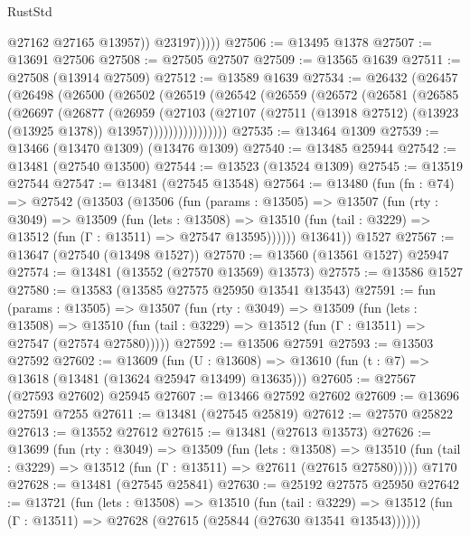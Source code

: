 \begin{lexlean}{RustStd}
\begin{coremodule}
                  @27162
                  @27165
                  @13957))
              @23197)))))
@27506 := @13495 @1378
@27507 := @13691 @27506
@27508 := @27505 @27507
@27509 := @13565 @1639
@27511 := @27508 (@13914 @27509)
@27512 := @13589 @1639
@27534 := @26432
    (@26457
      (@26498
        (@26500
          (@26502
            (@26519
              (@26542
                (@26559
                  (@26572
                    (@26581
                      (@26585
                        (@26697
                          (@26877
                            (@26959
                              (@27103
                                (@27107
                                  (@27511
                                    (@13918 @27512)
                                    (@13923 (@13925 @1378))
                                    @13957))))))))))))))))
@27535 := @13464 @1309
@27539 := @13466 (@13470 @1309) (@13476 @1309)
@27540 := @13485 @25944
@27542 := @13481 (@27540 @13500)
@27544 := @13523 (@13524 @1309)
@27545 := @13519 @27544
@27547 := @13481 (@27545 @13548)
@27564 := @13480
    (fun (fn : @74) =>
    @27542
      (@13503
        (@13506
          (fun (params : @13505) =>
          @13507
            (fun (rty : @3049) =>
            @13509
              (fun (lets : @13508) =>
              @13510 (fun (tail : @3229) => @13512 (fun (Γ : @13511) => @27547 @13595))))))
        @13641))
    @1527
@27567 := @13647 (@27540 (@13498 @1527))
@27570 := @13560 (@13561 @1527) @25947
@27574 := @13481 (@13552 (@27570 @13569) @13573)
@27575 := @13586 @1527
@27580 := @13583 (@13585 @27575 @25950 @13541 @13543)
@27591 := fun (params : @13505) =>
  @13507
    (fun (rty : @3049) =>
    @13509
      (fun (lets : @13508) =>
      @13510 (fun (tail : @3229) => @13512 (fun (Γ : @13511) => @27547 (@27574 @27580)))))
@27592 := @13506 @27591
@27593 := @13503 @27592
@27602 := @13609
    (fun (U : @13608) => @13610 (fun (t : @7) => @13618 (@13481 (@13624 @25947 @13499) @13635)))
@27605 := @27567 (@27593 @27602) @25945
@27607 := @13466 @27592 @27602
@27609 := @13696 @27591 @7255
@27611 := @13481 (@27545 @25819)
@27612 := @27570 @25822
@27613 := @13552 @27612
@27615 := @13481 (@27613 @13573)
@27626 := @13699
    (fun (rty : @3049) =>
    @13509
      (fun (lets : @13508) =>
      @13510 (fun (tail : @3229) => @13512 (fun (Γ : @13511) => @27611 (@27615 @27580)))))
    @7170
@27628 := @13481 (@27545 @25841)
@27630 := @25192 @27575 @25950
@27642 := @13721
    (fun (lets : @13508) =>
    @13510
      (fun (tail : @3229) =>
      @13512 (fun (Γ : @13511) => @27628 (@27615 (@25844 (@27630 @13541 @13543))))))

\end{coremodule}
\end{lexlean}
